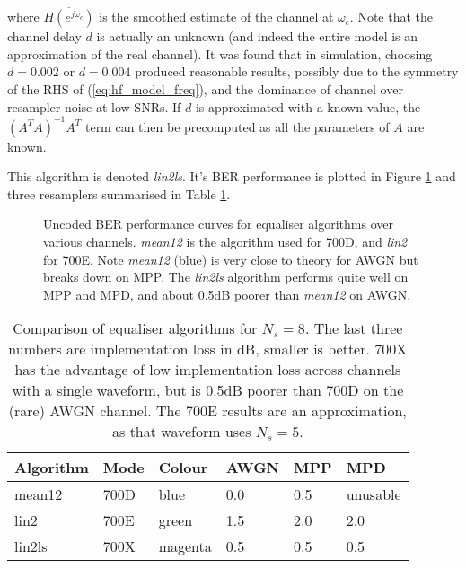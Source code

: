 \documentclass{article}
\begin{document}
where $\overline{H(e^{j \omega_c})}$ is the smoothed estimate of the channel at $\omega_c$.  Note that the channel delay $d$ is actually an unknown (and indeed the entire model is an approximation of the real channel). It was found that in simulation, choosing $d=0.002$ or $d=0.004$ produced reasonable results, possibly due to the symmetry of the RHS of (\ref{eq:hf_model_freq}), and the dominance of channel over resampler noise at low SNRs. If $d$ is approximated with a known value, the $(A^TA)^{-1}A^T$ term can then be precomputed as all the parameters of $A$ are known.

This algorithm is denoted \emph{lin2ls}.  It's BER performance is plotted in Figure \ref{fig:equaliser_curves} and three resamplers summarised in Table \ref{tab:resampler_summary}.

\begin{figure}[h]
\caption{Uncoded BER performance curves for equaliser algorithms over various channels. \emph{mean12} is the algorithm used for 700D, and \emph{lin2} for 700E.  Note \emph{mean12} (blue) is very close to theory for AWGN but breaks down on MPP.  The \emph{lin2ls} algorithm performs quite well on MPP and MPD, and about 0.5dB poorer than \emph{mean12} on AWGN.}
\label{fig:equaliser_curves}
\begin{center}

\end{center}
\end{figure}

\begin{table}[h]
\label{tab:resampler_summary}
\centering
\begin{tabular}{l l l l l l }
 \hline
 Algorithm & Mode & Colour & AWGN & MPP & MPD \\
 \hline
 mean12 & 700D & blue & 0.0 & 0.5 & unusable \\
 lin2 & 700E & green & 1.5 & 2.0 & 2.0 \\
 lin2ls & 700X & magenta & 0.5 & 0.5 & 0.5 \\
 \hline
\end{tabular}
\caption{Comparison of equaliser algorithms for $N_s=8$. The last three numbers are implementation loss in dB, smaller is better.  700X has the advantage of low implementation loss across channels with a single waveform, but is 0.5dB poorer than 700D on the (rare) AWGN channel.  The 700E results are an approximation, as that waveform uses $N_s=5$. }
\end{table}
\end{document}
